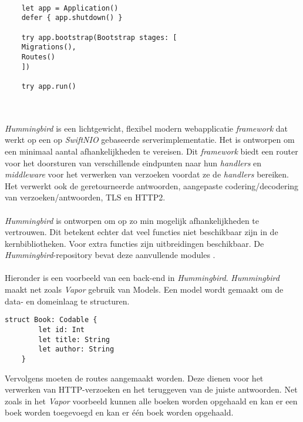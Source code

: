 \begin{lstlisting}[caption=Vapor example]
    
    let app = Application()
    defer { app.shutdown() }
    
    try app.bootstrap(Bootstrap stages: [
    Migrations(),
    Routes()
    ])
    
    try app.run()

\end{lstlisting}
 \\  \\


\textit{Hummingbird} is een lichtgewicht, flexibel modern webapplicatie \textit{framework} dat werkt op een op \textit{SwiftNIO} gebaseerde serverimplementatie. Het is ontworpen om een minimaal aantal afhankelijkheden te vereisen. Dit \textit{framework} biedt een router voor het doorsturen van verschillende eindpunten naar hun \textit{handlers} en \\\textit{middleware }voor het verwerken van verzoeken voordat ze de \textit{handlers} bereiken. Het verwerkt ook de geretourneerde antwoorden, aangepaste codering/decodering van verzoeken/antwoorden, TLS en HTTP2.  \\  \\
\textit{Hummingbird} is ontworpen om op zo min mogelijk afhankelijkheden te vertrouwen. Dit betekent echter dat veel functies niet beschikbaar zijn in de kernbibliotheken. Voor extra functies zijn uitbreidingen beschikbaar. De \textit{Hummingbird}-repository bevat deze aanvullende modules  \autocite{2024}.  \\  \\
Hieronder is een voorbeeld van een back-end in \textit{Hummingbird}. \textit{Hummingbird} maakt net zoals \textit{Vapor} gebruik van Models. Een model wordt gemaakt om de data- en domeinlaag te structuren. 
\begin{lstlisting}[caption=Himmingbird example - Model]
    struct Book: Codable {
        let id: Int
        let title: String
        let author: String
    }
\end{lstlisting}

Vervolgens moeten de routes aangemaakt worden. Deze dienen voor het verwerken van HTTP-verzoeken en het teruggeven van de juiste antwoorden. Net zoals in het \textit{Vapor} voorbeeld kunnen alle boeken worden opgehaald en kan er een boek worden toegevoegd en kan er één boek worden opgehaald. 

